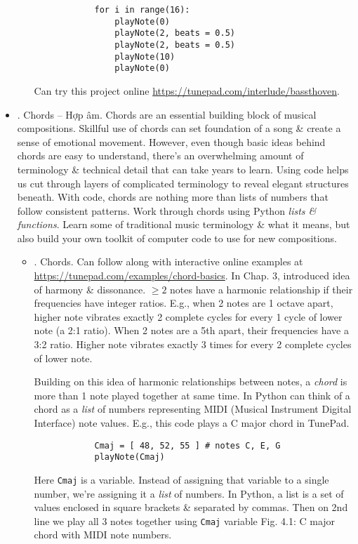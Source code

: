\documentclass{article}
\begin{document}
\begin{itemize}
\begin{enumerate}
\begin{verbatim}
			for i in range(16):
			    playNote(0)
			    playNote(2, beats = 0.5)
			    playNote(2, beats = 0.5)
			    playNote(10)
			    playNote(0)
		\end{verbatim}
		Can try this project online \url{https://tunepad.com/interlude/bassthoven}.
	\end{enumerate}
	\item {. Chords -- Hợp âm.} Chords are an essential building block of musical compositions. Skillful use of chords can set foundation of a song \& create a sense of emotional movement. However, even though basic ideas behind chords are easy to understand, there's an overwhelming amount of terminology \& technical detail that can take years to learn. Using code helps us cut through layers of complicated terminology to reveal elegant structures beneath. With code, chords are nothing more than lists of numbers that follow consistent patterns. Work through chords using Python {\it lists \& functions}. Learn some of traditional music terminology \& what it means, but also build your own toolkit of computer code to use for new compositions.
	\begin{itemize}
		\item {. Chords.} Can follow along with interactive online examples at \url{https://tunepad.com/examples/chord-basics}. In Chap. 3, introduced idea of harmony \& dissonance. $\ge2$ notes have a harmonic relationship if their frequencies have integer ratios. E.g., when 2 notes are 1 octave apart, higher note vibrates exactly 2 complete cycles for every 1 cycle of lower note (a 2:1 ratio). When 2 notes are a 5th apart, their frequencies have a 3:2 ratio. Higher note vibrates exactly 3 times for every 2 complete cycles of lower note.
		
		Building on this idea of harmonic relationships between notes, a {\it chord} is more than 1 note played together at same time. In Python can think of a chord as a {\it list} of numbers representing MIDI (Musical Instrument Digital Interface) note values. E.g., this code plays a C major chord in TunePad.
		\begin{verbatim}
			Cmaj = [ 48, 52, 55 ] # notes C, E, G
			playNote(Cmaj)
		\end{verbatim}
		Here {\tt Cmaj} is a variable. Instead of assigning that variable to a single number, we're assigning it a {\it list} of numbers. In Python, a list is a set of values enclosed in square brackets \& separated by commas. Then on 2nd line we play all 3 notes together using {\tt Cmaj} variable {\sf Fig. 4.1: C major chord with MIDI note numbers}.
		

\end{itemize}
\end{itemize}
\end{document}
